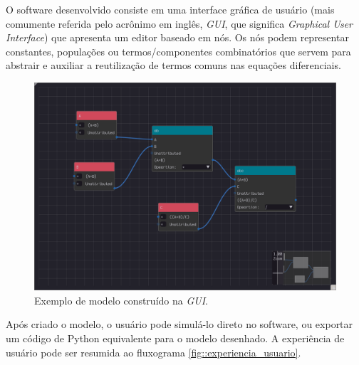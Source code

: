 \documentclass[
	12pt,				%
	openright,			%
	oneside,			%
	a4paper,			%
	main=brazil,
	english,			%
	]{ufsj-abntex2}
\begin{document}

O software desenvolvido consiste em uma interface gráfica de usuário (mais comumente referida pelo acrônimo em inglês, \textit{GUI}, que significa \textit{Graphical User Interface}) que apresenta um editor baseado em nós. Os nós podem representar constantes, populações ou termos/componentes combinatórios que servem para abstrair e auxiliar a reutilização de termos comuns nas equações diferenciais.

\begin{figure}[h]
    \centering
    \includegraphics[scale=0.42]{imgs/exemplo_gui.png} 
    \caption{Exemplo de modelo construído na \textit{GUI}.}
    \label{fig::exemplo_gui}
\end{figure}

Após criado o modelo, o usuário pode simulá-lo direto no software, ou exportar um código de Python equivalente para o modelo desenhado. A experiência de usuário pode ser resumida ao fluxograma \ref{fig::experiencia_usuario}.
\end{document}
